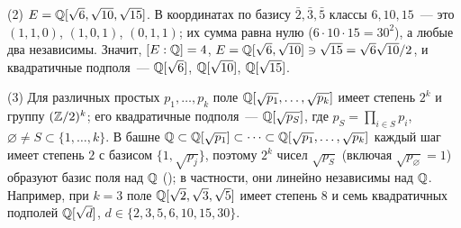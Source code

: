 \begin{example}
(2) $E=\mathbb Q[\sqrt6,\sqrt{10},\sqrt{15}]$. В координатах по базису $\bar2,\bar3,\bar5$ классы $6,10,15$~--- это
$(1,1,0)$, $(1,0,1)$, $(0,1,1)$; их сумма равна нулю ($6\cdot10\cdot15=30^2$), а любые два независимы. Значит,
$[E:\mathbb Q]=4$, $E=\mathbb Q[\sqrt6,\sqrt{10}]\ni\sqrt{15}=\sqrt6\sqrt{10}/2$, и квадратичные подполя~--- $\mathbb Q[\sqrt6]$,
$\mathbb Q[\sqrt{10}]$, $\mathbb Q[\sqrt{15}]$.

(3) Для различных простых $p_1,\dots,p_k$ поле $\mathbb Q[\sqrt{p_1},\dots,\sqrt{p_k}]$ имеет степень $2^k$ и группу
$(\mathbb Z/2)^k$; его квадратичные подполя~--- $\mathbb Q[\sqrt{p_S}]$, где $p_S=\prod_{i\in S}p_i$, $\varnothing\ne
S\subset\{1,\dots,k\}$. В башне $\mathbb Q\subset\mathbb Q[\sqrt{p_1}]\subset\dots\subset\mathbb Q[\sqrt{p_1},\dots,\sqrt{p_k}]$ каждый шаг
имеет степень $2$ с базисом $\{1,\sqrt{p_j}\}$, поэтому $2^k$ чисел $\sqrt{p_S}$ (включая $\sqrt{p_\varnothing}=1$)
образуют базис поля над $\mathbb Q$ (); в частности, они линейно независимы над $\mathbb Q$. Например, при $k=3$ поле
$\mathbb Q[\sqrt2,\sqrt3,\sqrt5]$ имеет степень $8$ и семь квадратичных подполей $\mathbb Q[\sqrt d]$, $d\in\{2,3,5,6,10,15,30\}$.
\end{example}

